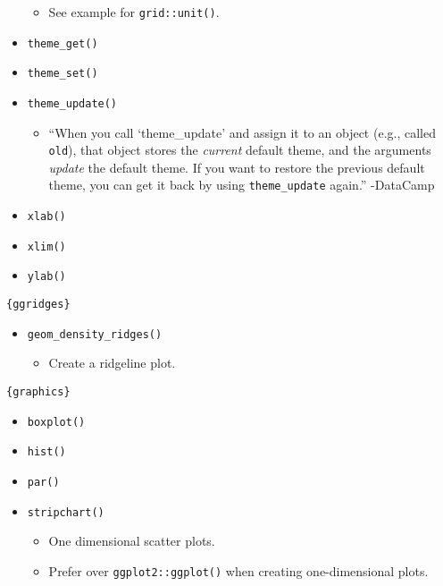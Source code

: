 \documentclass[
]{book}
\providecommand{\tightlist}{%
  \setlength{\itemsep}{0pt}\setlength{\parskip}{0pt}}
\begin{document}
\begin{itemize}
  \begin{itemize}
  \tightlist
  \item
    See example for \texttt{grid::unit()}.
  \end{itemize}
\item
  \texttt{theme\_get()}
\item
  \texttt{theme\_set()}
\item
  \texttt{theme\_update()}

  \begin{itemize}
  \tightlist
  \item
    ``When you call `theme\_update' and assign it to an object (e.g., called \texttt{old}), that object stores the \emph{current} default theme, and the arguments \emph{update} the default theme. If you want to restore the previous default theme, you can get it back by using \texttt{theme\_update} again.'' -DataCamp
  \end{itemize}
\item
  \texttt{xlab()}
\item
  \texttt{xlim()}
\item
  \texttt{ylab()}
\end{itemize}

\texttt{\{ggridges\}}

\begin{itemize}
\tightlist
\item
  \texttt{geom\_density\_ridges()}

  \begin{itemize}
  \tightlist
  \item
    Create a ridgeline plot.
  \end{itemize}
\end{itemize}

\texttt{\{graphics\}}

\begin{itemize}
\tightlist
\item
  \texttt{boxplot()}
\item
  \texttt{hist()}
\item
  \texttt{par()}
\item
  \texttt{stripchart()}

  \begin{itemize}
  \tightlist
  \item
    One dimensional scatter plots.
  \item
    Prefer over \texttt{ggplot2::ggplot()} when creating one-dimensional plots.
  \end{itemize}
\end{itemize}
\end{document}
